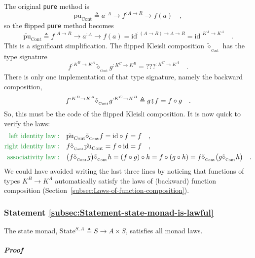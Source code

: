 The original \lstinline!pure! method is 
\[
\text{pu}_{\text{Cont}}\triangleq a^{:A}\rightarrow f^{:A\rightarrow R}\rightarrow f(a)\quad,
\]
so the flipped \lstinline!pure! method becomes
\[
\tilde{\text{pu}}_{\text{Cont}}\triangleq f^{:A\rightarrow R}\rightarrow a^{:A}\rightarrow f(a)=\text{id}^{:\left(A\rightarrow R\right)\rightarrow A\rightarrow R}=\text{id}^{:K^{A}\rightarrow K^{A}}\quad.
\]
This is a significant simplification. The flipped Kleisli composition
$\tilde{\diamond}_{_{\text{Cont}}}$ has the type signature
\[
f^{:K^{B}\rightarrow K^{A}}\tilde{\diamond}_{_{\text{Cont}}}g^{:K^{C}\rightarrow K^{B}}=\text{???}^{:K^{C}\rightarrow K^{A}}\quad.
\]
There is only one implementation of that type signature, namely the
backward composition,
\[
f^{:K^{B}\rightarrow K^{A}}\tilde{\diamond}_{_{\text{Cont}}}g^{:K^{C}\rightarrow K^{B}}\triangleq g\bef f=f\circ g\quad.
\]
So, this must be the code of the flipped Kleisli composition. It is
now quick to verify the laws:
\begin{align*}
{\color{greenunder}\text{left identity law}:}\quad & \tilde{\text{pu}}_{\text{Cont}}\tilde{\diamond}_{_{\text{Cont}}}f=\text{id}\circ f=f\quad,\\
{\color{greenunder}\text{right identity law}:}\quad & f\tilde{\diamond}_{_{\text{Cont}}}\tilde{\text{pu}}_{\text{Cont}}=f\circ\text{id}=f\quad,\\
{\color{greenunder}\text{associativity law}:}\quad & \big(f\tilde{\diamond}_{_{\text{Cont}}}g\big)\tilde{\diamond}_{_{\text{Cont}}}h=(f\circ g)\circ h=f\circ(g\circ h)=f\tilde{\diamond}_{_{\text{Cont}}}\big(g\tilde{\diamond}_{_{\text{Cont}}}h\big)\quad.
\end{align*}
We could have avoided writing the last three lines by noticing that
functions of types $K^{B}\rightarrow K^{A}$ automatically satisfy
the laws of (backward) function composition (Section~\ref{subsec:Laws-of-function-composition}).

\subsubsection{Statement \label{subsec:Statement-state-monad-is-lawful}\ref{subsec:Statement-state-monad-is-lawful}}

The state monad, $\text{State}^{S,A}\triangleq S\rightarrow A\times S$,
satisfies all monad laws.

\subparagraph{Proof}

